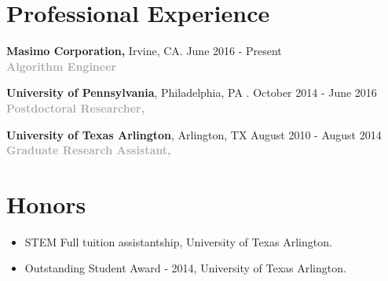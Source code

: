 \documentclass{my_cv}
\begin{document}
\section{Professional Experience}
\begin{flushleft}  


\textbf{Masimo Corporation,} Irvine, CA. \hfill June 2016 - Present\\ 
\textbf{\textcolor{darkgray}{Algorithm Engineer} }
\vspace{2mm} 

\textbf{University of Pennsylvania}, Philadelphia, PA . \hfill October 2014 - June 2016\\ 
\textbf{\textcolor{darkgray}{Postdoctoral Researcher,} }
\vspace{2mm} 

\textbf{University of Texas Arlington}, Arlington, TX \hfill August 2010 - August 2014 \\
\textbf{\textcolor{darkgray}{Graduate Research Assistant,} }

\end{flushleft}
 
\vspace{-7mm}  %


\section{{Honors}} 

\vspace{-5pt} %
\begin{itemize} \itemsep -2pt 
\item STEM Full tuition assistantship, University of Texas Arlington. \\
\item Outstanding Student Award - 2014, University of Texas Arlington. \\
\end{itemize}

\vspace{-7mm}  %

\end{document}
